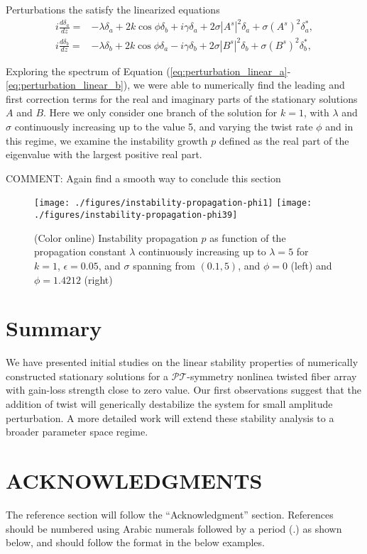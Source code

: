 \documentclass{aip-cp}
\newcommand{\pt}{$\mathcal{PT}$}
\begin{document}
Perturbations the satisfy the linearized equations
\begin{eqnarray}
i\frac{d\delta_a}{dz}=& -\lambda \delta_a +2 k \cos{\phi}\delta_b+i\gamma\delta_a+2\sigma|A^s|^2\delta_a+ \sigma(A^s)^2\delta_a^*, \label{eq:perturbation_linear_a}\\
i\frac{d\delta_b}{dz}=& -\lambda \delta_b +2 k \cos{\phi}\delta_a-i\gamma\delta_b+2\sigma|B^s|^2\delta_b+ \sigma(B^s)^2\delta_b^*, \label{eq:perturbation_linear_b}
\end{eqnarray}


Exploring the spectrum of Equation (\ref{eq:perturbation_linear_a}-\ref{eq:perturbation_linear_b}), we were able 
to numerically find the leading and first correction terms for the real and imaginary parts of the stationary 
solutions $A$ and $B$. Here we only consider 
one branch of the solution for $k = 1$,  with $\lambda$ and $\sigma$ continuously increasing up to the value 5, and varying the twist rate $\phi$ and in this regime,  
we examine the instability growth $p$ defined as the real part 
of the eigenvalue with the largest positive real part. 

COMMENT: Again find a smooth way to conclude this section 

\begin{figure}[h!]
    \centering
\texttt{[image: ./figures/instability-propagation-phi1]}  \label{fig:1pt}
\texttt{[image: ./figures/instability-propagation-phi39]} \label{fig:2pt}
\caption{(Color online) Instability propagation $p$ as function of the propagation constant $\lambda$ continuously increasing 
  up to $\lambda = 5$ for $k = 1$, $\epsilon = 0.05$, and $\sigma$ spanning from $(0.1,5)$, and $\phi =0$ (left) and $\phi =1.4212$ (right)}
\label{fig:linear-alternating-pt}
\end{figure}


\section{Summary}
We have presented initial studies on the linear stability properties of numerically constructed stationary solutions for a \pt-symmetry nonlinea twisted fiber array with 
gain-loss strength close to zero value. Our first observations suggest that the addition of twist will generically destabilize the system  for small amplitude perturbation. 
A more detailed work will extend these stability analysis to a broader parameter space regime.




\section{ACKNOWLEDGMENTS}
The reference section will follow the ``Acknowledgment'' section.  References should be numbered using Arabic numerals 
followed by a period (.) as shown below, and should follow the format in the below examples.



\nocite{*}
%
%
\end{document}
